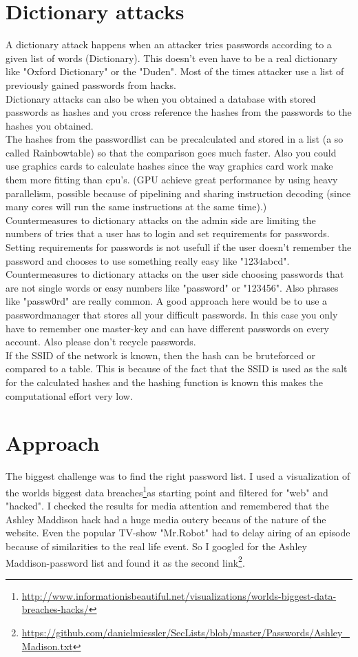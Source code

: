 \documentclass{scrartcl}
\begin{document}
\section*{Dictionary attacks}
A dictionary attack happens when an attacker tries passwords according to a given list of words (Dictionary). This doesn't even have to be a real dictionary like "Oxford Dictionary" or the "Duden". Most of the times attacker use a list of previously gained passwords from hacks. \\
Dictionary attacks can also be when you obtained a database with stored passwords as hashes and you cross reference the hashes from the passwords to the hashes you obtained.\\
The hashes from the passwordlist can be precalculated and stored in a list (a so called Rainbowtable) so that the comparison goes much faster. Also you could use graphics cards to calculate hashes since the way graphics card work make them more fitting than cpu's. (GPU achieve great performance by using heavy parallelism, possible because of pipelining and sharing instruction decoding (since many cores will run the same instructions at the same time).)\\
Countermeasures to dictionary attacks on the admin side are limiting the numbers of tries that a user has to login and set requirements for passwords. Setting requirements for passwords is not usefull if the user doesn't remember the password and chooses to use something really easy like "1234abcd".\\
Countermeasures to dictionary attacks on the user side choosing passwords that are not single words or easy numbers like "password" or "123456". Also phrases like "passw0rd" are really common. A good approach here would be to use a passwordmanager that stores all your difficult passwords. In this case you only have to remember one master-key and can have different passwords on every account. Also please don't recycle passwords.\\

If the SSID of the network is known, then the hash can be bruteforced or compared to a table. This is because of the fact that the SSID is used as the salt for the calculated hashes and the hashing function is known this makes the computational effort very low.

\section*{Approach}
The biggest challenge was to find the right password list. I used a visualization of the worlds biggest data breaches\footnote{\url{http://www.informationisbeautiful.net/visualizations/worlds-biggest-data-breaches-hacks/}}as starting point and filtered for "web" and "hacked". I checked the results for media attention and remembered that the Ashley Maddison hack had a huge media outcry becaus of the nature of the website. Even the popular TV-show "Mr.Robot" had to delay airing of an episode because of similarities to the real life event. So I googled for the Ashley Maddison-password list and found it as the second link\footnote{\url{https://github.com/danielmiessler/SecLists/blob/master/Passwords/Ashley_Madison.txt}}. \\
\end{document}
